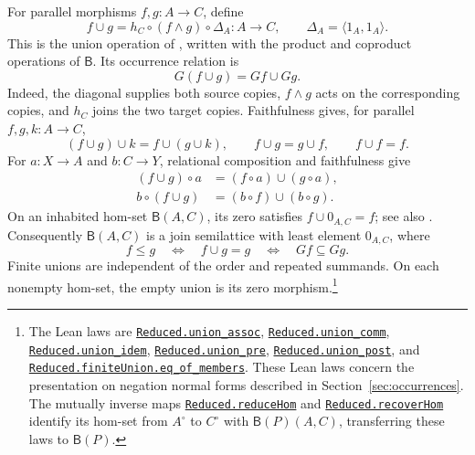 \documentclass[11pt]{article}
\newcommand{\B}{\mathsf B}
\begin{document}
For parallel morphisms $f,g:A\to C$, define
\[
 f\cup g=h_C\circ(f\wedge g)\circ\Delta_A:A\longrightarrow C,
 \qquad \Delta_A=\langle1_A,1_A\rangle.
\]
This is the union operation of \cite[p.~220]{DP}, written with
the product and coproduct operations of $\B$. Its occurrence
relation is
\[
 G(f\cup g)=Gf\cup Gg.
\]
Indeed, the diagonal supplies both source copies, $f\wedge g$
acts on the corresponding copies, and $h_C$ joins the two target
copies. Faithfulness gives, for parallel $f,g,k:A\to C$,
\[
 (f\cup g)\cup k=f\cup(g\cup k),\qquad
 f\cup g=g\cup f,\qquad f\cup f=f.
\]
For $a:X\to A$ and $b:C\to Y$, relational composition and
faithfulness give
\[
 \begin{aligned}
 (f\cup g)\circ a&=(f\circ a)\cup(g\circ a),\\
 b\circ(f\cup g)&=(b\circ f)\cup(b\circ g).
 \end{aligned}
\]
On an inhabited hom-set $\B(A,C)$, its zero satisfies
$f\cup0_{A,C}=f$; see also \cite[pp.~290--291]{DP}.
Consequently $\B(A,C)$ is a join semilattice with least element
$0_{A,C}$, where
\[
 f\leq g\quad\Longleftrightarrow\quad f\cup g=g
 \quad\Longleftrightarrow\quad Gf\subseteq Gg.
\]
Finite unions are independent of the order and repeated
summands. On each nonempty hom-set, the empty union is its zero morphism.\footnote{\raggedright The Lean laws are
\href{https://github.com/flengyel/Dosen-Petric-Maximality/blob/5dbee39bea09539bd130f729e82636419f71f920/DosenPetric/ReducedUnion.lean\#L131}{\texttt{Reduced.\allowbreak{}union\_assoc}},
\href{https://github.com/flengyel/Dosen-Petric-Maximality/blob/5dbee39bea09539bd130f729e82636419f71f920/DosenPetric/ReducedUnion.lean\#L90}{\texttt{Reduced.\allowbreak{}union\_comm}},
\href{https://github.com/flengyel/Dosen-Petric-Maximality/blob/5dbee39bea09539bd130f729e82636419f71f920/DosenPetric/ReducedUnion.lean\#L97}{\texttt{Reduced.\allowbreak{}union\_idem}},
\href{https://github.com/flengyel/Dosen-Petric-Maximality/blob/5dbee39bea09539bd130f729e82636419f71f920/DosenPetric/ReducedUnion.lean\#L80}{\texttt{Reduced.\allowbreak{}union\_pre}},
\href{https://github.com/flengyel/Dosen-Petric-Maximality/blob/5dbee39bea09539bd130f729e82636419f71f920/DosenPetric/ReducedUnion.lean\#L85}{\texttt{Reduced.\allowbreak{}union\_post}}, and
\href{https://github.com/flengyel/Dosen-Petric-Maximality/blob/5dbee39bea09539bd130f729e82636419f71f920/DosenPetric/ReducedFiniteUnion.lean\#L57}{\texttt{Reduced.finiteUnion.\allowbreak{}eq\_of\_members}}.
These Lean laws concern the presentation on negation normal forms
described in Section~\ref{sec:occurrences}. The mutually inverse maps
\href{https://github.com/flengyel/Dosen-Petric-Maximality/blob/5dbee39bea09539bd130f729e82636419f71f920/DosenPetric/ReducedQuotientReduction.lean\#L21}{\texttt{Reduced.\allowbreak{}reduceHom}} and
\href{https://github.com/flengyel/Dosen-Petric-Maximality/blob/5dbee39bea09539bd130f729e82636419f71f920/DosenPetric/ReducedRecovery.lean\#L26}{\texttt{Reduced.\allowbreak{}recoverHom}} identify its hom-set from $A^\circ$ to $C^\circ$ with
$\B(P)(A,C)$, transferring these laws to $\B(P)$.}
\end{document}
